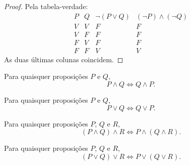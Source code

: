 \documentclass[../../main]{subfiles}
\begin{document}
\begin{proof}
	Pela tabela-verdade:
	\begin{equation*}
		\begin{array}{c|c|c|c}
			P & Q & \neg(P \lor Q) & (\neg P)\land(\neg Q) \\
			\hline
			V & V & F              & F                     \\
			V & F & F              & F                     \\
			F & V & F              & F                     \\
			F & F & V              & V
		\end{array}
	\end{equation*}
	As duas últimas colunas coincidem.

\end{proof}

\begin{prop}
	\label{prop:matematica:logica-matematica:logica-proposicional:comutatividade-da-conjuncao}

	Para quaisquer proposições \(P\) e \(Q\),
	\begin{equation*}
		P \land Q \Leftrightarrow Q \land P.
	\end{equation*}
\end{prop}

\begin{prop}
	\label{prop:matematica:logica-matematica:logica-proposicional:comutatividade-da-disjuncao}

	Para quaisquer proposições \(P\) e \(Q\),
	\begin{equation*}
		P \lor Q \Leftrightarrow Q \lor P.
	\end{equation*}
\end{prop}

\begin{prop}
	\label{prop:matematica:logica-matematica:logica-proposicional:associatividade-da-conjuncao}

	Para quaisquer proposições \(P\), \(Q\) e \(R\),
	\begin{equation*}
		(P \land Q)\land R \Leftrightarrow P\land(Q\land R).
	\end{equation*}
\end{prop}

\begin{prop}
	\label{prop:matematica:logica-matematica:logica-proposicional:associatividade-da-disjuncao}

	Para quaisquer proposições \(P\), \(Q\) e \(R\),
	\begin{equation*}
		(P \lor Q)\lor R \Leftrightarrow P\lor(Q\lor R).
	\end{equation*}
\end{prop}
\end{document}
